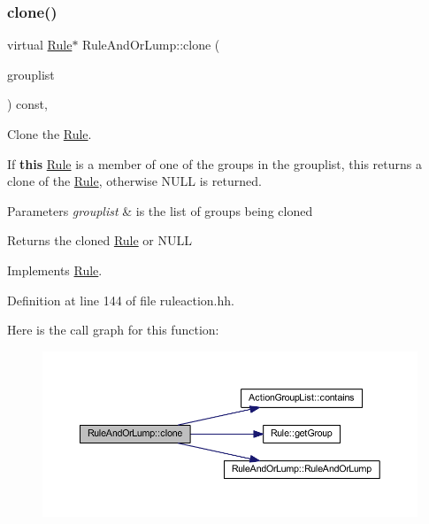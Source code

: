 \subsubsection{\texorpdfstring{clone()}{clone()}}
{\footnotesize\ttfamily virtual \mbox{\hyperlink{class_rule}{Rule}}$\ast$ Rule\+And\+Or\+Lump\+::clone (\begin{DoxyParamCaption}\item[{const \mbox{\hyperlink{class_action_group_list}{Action\+Group\+List}} \&}]{grouplist }\end{DoxyParamCaption}) const\hspace{0.3cm}{\ttfamily [inline]}, {\ttfamily [virtual]}}



Clone the \mbox{\hyperlink{class_rule}{Rule}}. 

If {\bfseries{this}} \mbox{\hyperlink{class_rule}{Rule}} is a member of one of the groups in the grouplist, this returns a clone of the \mbox{\hyperlink{class_rule}{Rule}}, otherwise N\+U\+LL is returned. 
\begin{DoxyParams}{Parameters}
{\em grouplist} & is the list of groups being cloned \\
\hline
\end{DoxyParams}
\begin{DoxyReturn}{Returns}
the cloned \mbox{\hyperlink{class_rule}{Rule}} or N\+U\+LL 
\end{DoxyReturn}


Implements \mbox{\hyperlink{class_rule_a70de90a76461bfa7ea0b575ce3c11e4d}{Rule}}.



Definition at line 144 of file ruleaction.\+hh.

Here is the call graph for this function\+:
\nopagebreak
\begin{figure}[H]
\begin{center}
\leavevmode
\includegraphics[width=350pt]{class_rule_and_or_lump_a6ca08216a9a64058fae83a1718a67301_cgraph}
\end{center}
\end{figure}
\mbox{\label{class_rule_and_or_lump_aa40ff67a44e672e88dbb6485309a482f}} 
